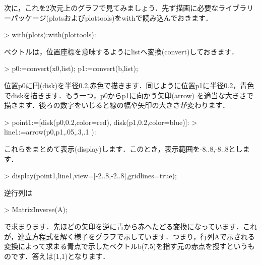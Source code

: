 次に，これを2次元上のグラフで見てみましょう．先ず描画に必要なライブラリーパッケージ(plotsおよびplottools)をwithで読み込んでおきます．
\begin{MapleInput}
> with(plots):with(plottools): 
\end{MapleInput}
ベクトルは，位置座標を意味するようにlistへ変換(convert)しておきます．
\begin{MapleInput}
> p0:=convert(x0,list); p1:=convert(b,list); 
\end{MapleInput}
位置p0に円(disk)を半径0.2,赤色で描きます．同じように位置p1に半径0.2，青色でdiskを描きます．もう一つ，p0からp1に向かう矢印(arrow)
を適当な大きさで描きます．後ろの数字をいじると線の幅や矢印の大きさが変わります．
\begin{MapleInput}
> point1:=[disk(p0,0.2,color=red), disk(p1,0.2,color=blue)]:
> line1:=arrow(p0,p1,.05,.3,.1 ):
\end{MapleInput}

これらをまとめて表示(display)します．このとき，表示範囲を-8..8,-8..8とします．
\begin{MapleInput}
> display(point1,line1,view=[-2..8,-2..8],gridlines=true);
\end{MapleInput}

逆行列は
\begin{MapleInput}
> MatrixInverse(A);
\end{MapleInput}
\begin{MapleOutput}
\left[ \begin {array}{cc} -1/18&5/18\\ 2/9&-1/9\end {array} \right]
\end{MapleOutput}
で求まります．先ほどの矢印を逆に青から赤へたどる変換になっています．これが，連立方程式を解く様子をグラフで示しています．つまり，行列Aで示される変換によって求まる青点で示したベクトルb(7,5)を指す元の赤点を捜すというものです．答えは(1,1)となります．

